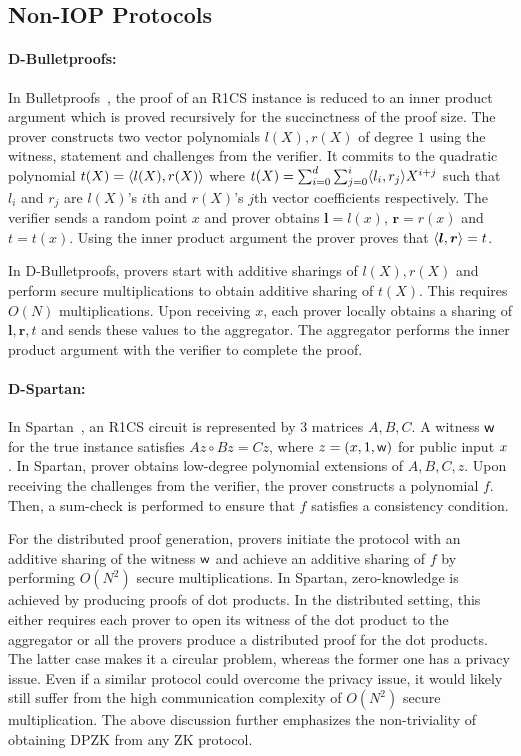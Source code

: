 \subsection{Non-IOP Protocols}
\paragraph*{D-Bulletproofs:}
In Bulletproofs~\cite{bulletproofs}, the proof of an R1CS instance is reduced to an inner product argument which is proved recursively for the succinctness of the proof size. 
The prover constructs two vector polynomials $l(X), r(X)$ of degree $1$ using the witness, statement and challenges from the verifier. It commits to the quadratic polynomial $t(X) = \langle l(X),r(X)\rangle$ where $t(X) = \sum_{i=0}^{d} \sum_{j=0}^{i} \langle l_i,r_j\rangle X^{i+j}$ such that $l_i$ and $r_j$ are $l(X)$'s $i$th and $r(X)$'s $j$th vector coefficients respectively.
The verifier sends a random point $x$ and prover obtains ${\bm l} = l(x)$, ${\bm r} = r(x)$ and $t = t(x)$. Using the inner product argument the prover proves that $\langle {\bm l},{\bm r}\rangle = t$.

In D-Bulletproofs, provers start with additive sharings of $l(X), r(X)$ and perform secure multiplications to obtain additive sharing of $t(X)$. This requires $O(N)$ multiplications. Upon receiving $x$, each prover locally obtains a sharing of ${\bm l,\bm r}, t$ and sends these values to the aggregator. The aggregator performs the inner product argument with the verifier to complete the proof.
%

\vspace*{-.3cm}
\paragraph*{D-Spartan:}
In Spartan~\cite{spartan}, an R1CS circuit is represented by 3 matrices $A, B, C$. A witness $\mathsf{w}$ for the true instance satisfies $Az  \circ Bz = Cz$, where $z = ({x}, 1, \mathsf{w})$ for public input ${x}$. In Spartan, prover obtains low-degree polynomial extensions of $A, B, C, z$. Upon receiving the challenges from the verifier, the prover constructs a polynomial $f$. 
Then, a sum-check is performed to ensure that $f$ satisfies a consistency condition.

For the distributed proof generation, provers initiate the protocol with an additive sharing of the witness $\mathsf{w}$ and achieve an additive sharing of $f$ by performing $O(N^2)$ secure multiplications. In Spartan, zero-knowledge is achieved by producing proofs of dot products. In the distributed setting, this either requires each prover to open its witness of the dot product to the aggregator or all the provers produce a distributed proof for the dot products. The latter case makes it a circular problem, whereas the former one has a privacy issue.
Even if a similar protocol could overcome the privacy issue, it would likely still suffer from the high communication complexity of $O(N^2)$ secure multiplication.
The above discussion further emphasizes the non-triviality of obtaining DPZK from any ZK protocol. 

